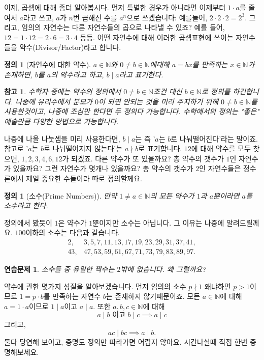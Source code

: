 \documentclass[a4paper, 11pt]{report}
\renewcommand{\<}{\langle}
\renewcommand{\>}{\rangle}
\newtheorem{dfn}[thm]{정의}
\newtheorem{remark}[thm]{참고}
\newtheorem{exercise}[thm]{연습문제}
\begin{document}
이제, 곱셈에 대해 좀더 알아봅시다. 먼저 특별한 경우가 아니라면 이제부터 $1\cdot a$를 줄여서 
$a$라고 쓰고, $a$가 $n$번 곱해진 수를 $a^n$으로 쓰겠습니다: 예를들어, $2\cdot2 \cdot 2 = 2^3$.
그리고, 임의의 자연수는 다른 자연수들의 곱으로 나타낼 수 있죠? 예를 들어,
$12 = 1\cdot12 = 2\cdot6 = 3\cdot 4$ 등등. 어떤 자연수에 대해 이러한 곱셈표현에 쓰이는 자연수들을 
약수(Divisor/Factor)라고 합니다.

\begin{dfn}[자연수에 대한 약수]
  $a \in \mathbb{N}$와 $0 \neq b \in \mathbb{N}$에대해 $a = bx$를 만족하는 $x \in \mathbb{N}$가 존재하면, 
  $b$를 $a$의 약수라고 하고, $b \mid a$라고 표기한다.
\end{dfn}

\begin{remark}
  수학자 중에는 약수의 정의에서 $0 \neq b \in \mathbb{N}$조건 대신 $b \in \mathbb{N}$로 정의를 하긴합니다. 
  나중에 유리수에서 분모가 $0$이 되면 안되는 것을 미리 주지하기 위해 $0 \neq b \in \mathbb{N}$를 사용한것이고,
  나중에 조심만 한다면 두 정의다 가능합니다. 수학에서의 정의는 "좋은" 예술만큼 다양한 방법으로 가능합니다.
\end{remark}

나중에 나올 나눗셈을 미리 사용한다면, $b \mid a$는 즉 '$a$는 $b$로 나눠떨어진다'라는 말이죠. 
참고로 '$a$는 $b$로 나눠떨어지지 않는다'는 $a \nmid b$로 표기합니다. $12$에
대해 약수를 모두 찾으면, $1, 2, 3, 4, 6, 12$가 되겠죠. 다른 약수가 또 있을까요? 총 약수의 갯수가 $1$인 자연수가
있을까요? 그런 자연수가 몇개나 있을까요? 총 약수의 갯수가 $2$인 자연수들은 정수론에서 제일 중요한 수들이라 따로
정의할께요.

\begin{dfn}[소수(Prime Numbers)]
  만약 $1 \neq a \in \mathbb{N}$의 모든 약수가 $1$과 $a$뿐이라면 $a$를 소수라고 한다.
\end{dfn}

정의에서 봤듯이 $1$은 약수가 $1$뿐이지만 소수는 아닙니다. 그 이유는 나중에 알려드릴께요. $100$이하의 소수는 
다음과 같습니다.
\begin{align*}
2,& 3, 5, 7, 11, 13, 17, 19, 23, 29, 31, 37, 41,\\ 
43,& 47, 53, 59, 61, 67, 71, 73, 79, 83, 89, 97.
\end{align*}

\begin{exercise}
  소수들 중 유일한 짝수는 $2$밖에 없습니다. 왜 그럴까요? 
\end{exercise}

약수에 관한 몇가지 성질을 알아보겠습니다. 먼저 임의의 소수 $p \nmid 1$ 왜냐하면 $p > 1$이므로 
$1 = p\cdot b$를 만족하는 자연수 $b$는 존재하지 않기때문이죠. 모든 $a \in \mathbb{N}$에
대해 $a = 1\cdot a$이므로 $1 \mid a$이고 $a \mid a$. 또한 $a, b, c \in \mathbb{N}$에 대해
$$
a \mid b \text{ 이고 } b \mid c \implies a \mid c
$$
그리고,
$$
ac \mid bc \implies a \mid b.
$$
둘다 당연해 보이고, 증명도 정의만 따라가면 어렵지 않아요. 시간나실때 직접 한번 증명해보세요.
\end{document}
